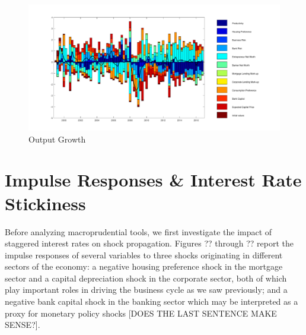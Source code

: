 \documentclass[12pt]{article}
\numberwithin{equation}{section}
\begin{document}



\begin{figure}[H]
\centering
\caption{Output Growth}
\label{decomp_dy_figure}
\includegraphics[scale=0.45]{decomp_dy.pdf}
\end{figure}




\section*{Impulse Responses \& Interest Rate Stickiness}

Before analyzing macroprudential tools, we first investigate the impact of staggered interest rates on shock propagation. Figures ?? through ?? report the impulse responses of several variables to three shocks originating in different sectors of the economy: a negative housing preference shock in the mortgage sector and a capital depreciation shock in the corporate sector, both of which play important roles in driving the business cycle as we saw previously; and a negative bank capital shock in the banking sector which may be interpreted as a proxy for monetary policy shocks [DOES THE LAST SENTENCE MAKE SENSE?]. 
\end{document}
